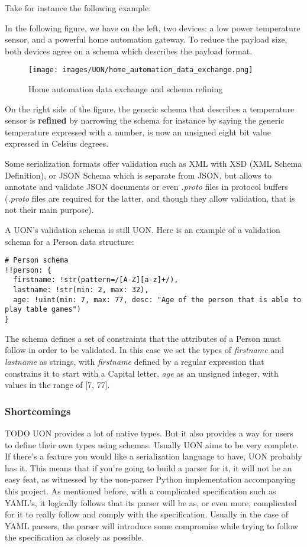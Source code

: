\documentclass[12pt]{article}
\begin{document}
Take for instance the following example:

In the following figure, we have on the left, two devices: a low power temperature sensor, and a powerful home automation gateway. To reduce the payload size, both devices agree on a schema which describes the payload format.

\begin{figure}[ht!]
 	\centering
 	\caption{Home automation data exchange and schema refining}
 	\texttt{[image: images/UON/home\_automation\_data\_exchange.png]}
 	\label{lab:perceptron}
\end{figure}

On the right side of the figure, the generic schema that describes a temperature sensor is \textbf{refined} by narrowing the schema for instance by saying the generic temperature expressed with a number, is now an unsigned eight bit value expressed in Celsius degrees.

Some serialization formats offer validation such as XML with XSD (XML Schema Definition), or JSON Schema which is separate from JSON, but allows to annotate and validate JSON documents or even \emph{.proto} files in protocol buffers (\emph{.proto} files are required for the latter, and though they allow validation, that is not their main purpose).

A UON’s validation schema is still UON. Here is an example of a validation schema for a Person data structure:

\begin{lstlisting}
# Person schema
!!person: {
  firstname: !str(pattern=/[A-Z][a-z]+/),
  lastname: !str(min: 2, max: 32),
  age: !uint(min: 7, max: 77, desc: "Age of the person that is able to play table games")
}
\end{lstlisting}

The schema defines a set of constraints that the attributes of a Person must follow in order to be validated. In this case we set the types of \emph{firstname} and \emph{lastname} as strings, with \emph{firstname} defined by a regular expression that constrains it to start with a Capital letter, \emph{age} as an unsigned integer, with values in the range of [7, 77].

\subsubsection{Shortcomings}
TODO
UON provides a lot of native types. But it also provides a way for users to define their own types using schemas. Usually
UON aims to be very complete. If there's a feature you would like a serialization language to have, UON probably has it. This means that if you're going to build a parser for it, it will not be an easy feat, as witnessed by the uon-parser Python implementation accompanying this project. As mentioned before, with a complicated specification such as YAML's, it logically follows that its parser will be as, or even more, complicated for it to really follow and comply with the specification. Usually in the case of YAML parsers, the parser will introduce some compromise while trying to follow the specification as closely as possible.
\end{document}
